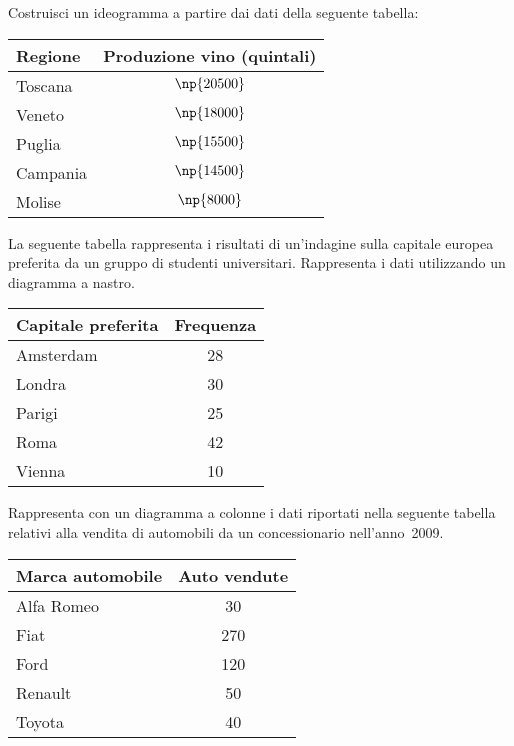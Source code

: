 \begin{esercizio}
\label{ese:A.14}
Costruisci un ideogramma a partire dai dati della seguente tabella:
\begin{center}
\begin{tabular}{lc}
\toprule
Regione & Produzione vino (quintali)\\
\midrule
Toscana & $\np{20500}$\\
Veneto & $\np{18000}$\\
Puglia & $\np{15500}$\\
Campania & $\np{14500}$\\
Molise & $\np{8000}$\\
\bottomrule
\end{tabular}
\end{center}
\end{esercizio}

\pagebreak
\begin{esercizio}
\label{ese:A.15}
La seguente tabella rappresenta i risultati di un'indagine sulla capitale europea preferita da un gruppo di studenti universitari.
Rappresenta i dati utilizzando un diagramma a nastro.
\begin{center}
\begin{tabular}{lc}
\toprule
Capitale preferita & Frequenza\\
\midrule
Amsterdam & 28\\
Londra & 30\\
Parigi & 25\\
Roma & 42\\
Vienna & 10\\
\bottomrule
\end{tabular}
\end{center}
\end{esercizio}

\begin{esercizio}
\label{ese:A.16}
Rappresenta con un diagramma a colonne i dati riportati nella seguente tabella relativi alla vendita di automobili da un concessionario nell'anno~2009.
\begin{center}
\begin{tabular}{lc}
\toprule
Marca automobile & Auto vendute\\
\midrule
Alfa Romeo & 30\\
Fiat & 270\\
Ford & 120\\
Renault & 50\\
Toyota & 40\\
\bottomrule
\end{tabular}
\end{center}
\end{esercizio}

